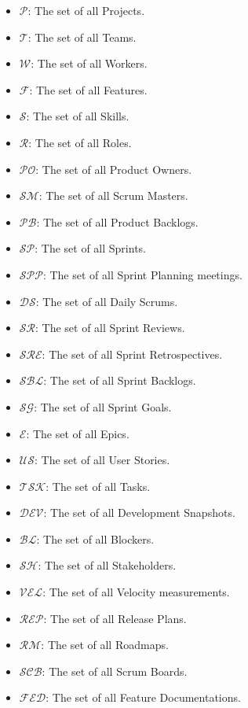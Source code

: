 \documentclass[11pt]{article}
\begin{document}
\begin{itemize}
    \item $\mathcal{P}$: The set of all Projects.
    \item $\mathcal{T}$: The set of all Teams.
    \item $\mathcal{W}$: The set of all Workers.
    \item $\mathcal{F}$: The set of all Features.
    \item $\mathcal{S}$: The set of all Skills.
    \item $\mathcal{R}$: The set of all Roles.
    \item $\mathcal{PO}$: The set of all Product Owners.
    \item $\mathcal{SM}$: The set of all Scrum Masters.
    \item $\mathcal{PB}$: The set of all Product Backlogs.
    \item $\mathcal{SP}$: The set of all Sprints.
    \item $\mathcal{SPP}$: The set of all Sprint Planning meetings.
    \item $\mathcal{DS}$: The set of all Daily Scrums.
    \item $\mathcal{SR}$: The set of all Sprint Reviews.
    \item $\mathcal{SRE}$: The set of all Sprint Retrospectives.
    \item $\mathcal{SBL}$: The set of all Sprint Backlogs.
    \item $\mathcal{SG}$: The set of all Sprint Goals.
    \item $\mathcal{E}$: The set of all Epics.
    \item $\mathcal{US}$: The set of all User Stories.
    \item $\mathcal{TSK}$: The set of all Tasks.
    \item $\mathcal{DEV}$: The set of all Development Snapshots.
    \item $\mathcal{BL}$: The set of all Blockers.
    \item $\mathcal{SH}$: The set of all Stakeholders.
    \item $\mathcal{VEL}$: The set of all Velocity measurements.
    \item $\mathcal{REP}$: The set of all Release Plans.
    \item $\mathcal{RM}$: The set of all Roadmaps.
    \item $\mathcal{SCB}$: The set of all Scrum Boards.
    \item $\mathcal{FED}$: The set of all Feature Documentations.
\end{itemize}
\end{document}
